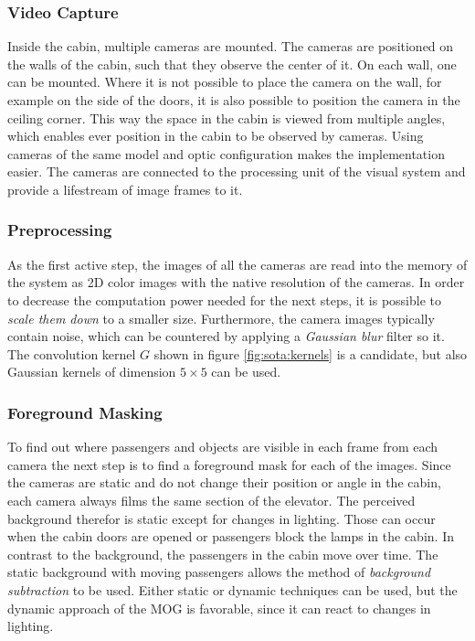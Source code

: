\subsubsection{Video Capture}
Inside the cabin, multiple cameras are mounted.
The cameras are positioned on the walls of the cabin, such that they observe the center of it.
On each wall, one can be mounted.
Where it is not possible to place the camera on the wall, for example on the side of the doors,
it is also possible to position the camera in the ceiling corner.
This way the space in the cabin is viewed from multiple angles, 
which enables ever position in the cabin to be observed by cameras. 
Using cameras of the same model and optic configuration makes the implementation easier.
The cameras are connected to the processing unit of the visual system and provide a lifestream of image frames to it.

\subsubsection{Preprocessing}
As the first active step, the images of all the cameras 
are read into the memory of the system as \ac{2D} color images 
with the native resolution of the cameras.
In order to decrease the computation power needed for the next steps, 
it is possible to \emph{scale them down} to a smaller size.
Furthermore, the camera images typically contain noise, 
which can be countered by applying a \emph{Gaussian blur} filter so it.
The convolution kernel $ G $ shown in figure \ref{fig:sota:kernels} is a candidate,
but also Gaussian kernels of dimension $ 5 \times 5 $ can be used.

\subsubsection{Foreground Masking}
To find out where passengers and objects are visible in each frame from each camera the next step is to find a foreground mask for each of the images.
Since the cameras are static and do not change their position or angle in the cabin,
each camera always films the same section of the elevator.
The perceived background therefor is static except for changes in lighting.
Those can occur when the cabin doors are opened or passengers block the lamps in the cabin.
In contrast to the background, the passengers in the cabin move over time.
The static background with moving passengers allows the method of \emph{background subtraction} to be used.
Either static or dynamic techniques can be used, 
but the dynamic approach of the \ac{MOG} is favorable, 
since it can react to changes in lighting.

